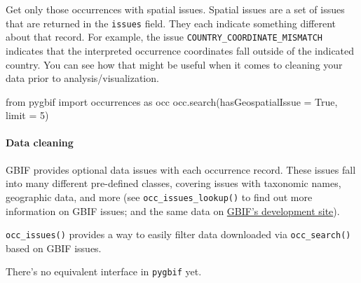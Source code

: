 \documentclass[author-year, review, 11pt]{components/elsarticle} %
\newenvironment{Shaded}{\begin{snugshade}}{\end{snugshade}}
\newcommand{\KeywordTok}[1]{\textcolor[rgb]{0.13,0.29,0.53}{\textbf{{#1}}}}
\newcommand{\DataTypeTok}[1]{\textcolor[rgb]{0.13,0.29,0.53}{{#1}}}
\newcommand{\DecValTok}[1]{\textcolor[rgb]{0.00,0.00,0.81}{{#1}}}
\newcommand{\CharTok}[1]{\textcolor[rgb]{0.31,0.60,0.02}{{#1}}}
\newcommand{\StringTok}[1]{\textcolor[rgb]{0.31,0.60,0.02}{{#1}}}
\newcommand{\CommentTok}[1]{\textcolor[rgb]{0.56,0.35,0.01}{\textit{{#1}}}}
\newcommand{\OtherTok}[1]{\textcolor[rgb]{0.56,0.35,0.01}{{#1}}}
\newcommand{\NormalTok}[1]{{#1}}
\begin{document}
Get only those occurrences with spatial issues. Spatial issues are a set
of issues that are returned in the \texttt{issues} field. They each
indicate something different about that record. For example, the issue
\texttt{COUNTRY\_COORDINATE\_MISMATCH} indicates that the interpreted
occurrence coordinates fall outside of the indicated country. You can
see how that might be useful when it comes to cleaning your data prior
to analysis/visualization.

\begin{Shaded}
\begin{Highlighting}[]
\CharTok{from} \NormalTok{pygbif }\CharTok{import} \NormalTok{occurrences }\CharTok{as} \NormalTok{occ}
\NormalTok{occ.search(hasGeospatialIssue = }\OtherTok{True}\NormalTok{, limit = }\DecValTok{5}\NormalTok{)}
\end{Highlighting}
\end{Shaded}

\paragraph{Data cleaning}\label{data-cleaning}

GBIF provides optional data issues with each occurrence record. These
issues fall into many different pre-defined classes, covering issues
with taxonomic names, geographic data, and more (see
\texttt{occ\_issues\_lookup()} to find out more information on GBIF
issues; and the same data on
\href{http://gbif.github.io/gbif-api/apidocs/org/gbif/api/vocabulary/OccurrenceIssue.html}{GBIF's
development site}).

\texttt{occ\_issues()} provides a way to easily filter data downloaded
via \texttt{occ\_search()} based on GBIF issues.

\begin{Shaded}
\end{Shaded}

There's no equivalent interface in \texttt{pygbif} yet.
\end{document}
